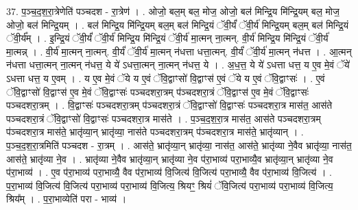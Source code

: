 \documentclass[17pt]{extarticle}
\begin{document}
37. प॒ञ्च॒द॒श॒रा॒त्रेणेति॑ पञ्चदश - रा॒त्रेण॑ । . ओजो॒ बल॒म् बल॒ मोज॒ ओजो॒ बल॑ मिन्द्रि॒य मि॑न्द्रि॒यम् बल॒ मोज॒ ओजो॒ बल॑ मिन्द्रि॒यम् । . बल॑ मिन्द्रि॒य मि॑न्द्रि॒यम् बल॒म् बल॑ मिन्द्रि॒यं ॅवी॒र्यं॑ ॅवी॒र्य॑ मिन्द्रि॒यम् बल॒म् बल॑ मिन्द्रि॒यं ॅवी॒र्य᳚म् । . इ॒न्द्रि॒यं ॅवी॒र्यं॑ ॅवी॒र्य॑ मिन्द्रि॒य मि॑न्द्रि॒यं ॅवी॒र्य॑ मा॒त्मन् ना॒त्मन्. वी॒र्य॑ मिन्द्रि॒य मि॑न्द्रि॒यं ॅवी॒र्य॑ मा॒त्मन्न् । . वी॒र्य॑ मा॒त्मन् ना॒त्मन्. वी॒र्यं॑ ॅवी॒र्य॑ मा॒त्मन् न॑धत्ता धत्ता॒त्मन्. वी॒र्यं॑ ॅवी॒र्य॑ मा॒त्मन् न॑धत्त । . आ॒त्मन् न॑धत्ता धत्ता॒त्मन् ना॒त्मन् न॑धत्त॒ ये ये॑ ऽधत्ता॒त्मन् ना॒त्मन् न॑धत्त॒ ये । . अ॒ध॒त्त॒ ये ये॑ ऽधत्ता धत्त॒ य ए॒व मे॒वं ॅये॑ ऽधत्ता धत्त॒ य ए॒वम् । . य ए॒व मे॒वं ॅये य ए॒वं ॅवि॒द्वाꣳसो॑ वि॒द्वाꣳस॑ ए॒वं ॅये य ए॒वं ॅवि॒द्वाꣳसः॑ । . ए॒वं ॅवि॒द्वाꣳसो॑ वि॒द्वाꣳस॑ ए॒व मे॒वं ॅवि॒द्वाꣳसः॑ पञ्चदशरा॒त्रम् प॑ञ्चदशरा॒त्रं ॅवि॒द्वाꣳस॑ ए॒व मे॒वं ॅवि॒द्वाꣳसः॑ पञ्चदशरा॒त्रम् । . वि॒द्वाꣳसः॑ पञ्चदशरा॒त्रम् प॑ञ्चदशरा॒त्रं ॅवि॒द्वाꣳसो॑ वि॒द्वाꣳसः॑ पञ्चदशरा॒त्र मास॑त॒ आस॑ते पञ्चदशरा॒त्रं ॅवि॒द्वाꣳसो॑ वि॒द्वाꣳसः॑ पञ्चदशरा॒त्र मास॑ते । . प॒ञ्च॒द॒श॒रा॒त्र मास॑त॒ आस॑ते पञ्चदशरा॒त्रम् प॑ञ्चदशरा॒त्र मास॑ते॒ भ्रातृ॑व्या॒न् भ्रातृ॑व्या॒ नास॑ते पञ्चदशरा॒त्रम् प॑ञ्चदशरा॒त्र मास॑ते॒ भ्रातृ॑व्यान् । . प॒ञ्च॒द॒श॒रा॒त्रमिति॑ पञ्चदश - रा॒त्रम् । . आस॑ते॒ भ्रातृ॑व्या॒न् भ्रातृ॑व्या॒ नास॑त॒ आस॑ते॒ भ्रातृ॑व्या ने॒वैव भ्रातृ॑व्या॒ नास॑त॒ आस॑ते॒ भ्रातृ॑व्या ने॒व । . भ्रातृ॑व्या ने॒वैव भ्रातृ॑व्या॒न् भ्रातृ॑व्या ने॒व प॑रा॒भाव्य॑ परा॒भाव्यै॒व भ्रातृ॑व्या॒न् भ्रातृ॑व्या ने॒व प॑रा॒भाव्य॑ । . ए॒व प॑रा॒भाव्य॑ परा॒भाव्यै॒ वैव प॑रा॒भाव्य॑ वि॒जित्य॑ वि॒जित्य॑ परा॒भाव्यै॒ वैव प॑रा॒भाव्य॑ वि॒जित्य॑ । . प॒रा॒भाव्य॑ वि॒जित्य॑ वि॒जित्य॑ परा॒भाव्य॑ परा॒भाव्य॑ वि॒जित्य॒ श्रियꣳ॒॒ श्रियं॑ ॅवि॒जित्य॑ परा॒भाव्य॑ परा॒भाव्य॑ वि॒जित्य॒ श्रिय᳚म् । . प॒रा॒भाव्येति॑ परा - भाव्य॑ । \newline
\end{document}
